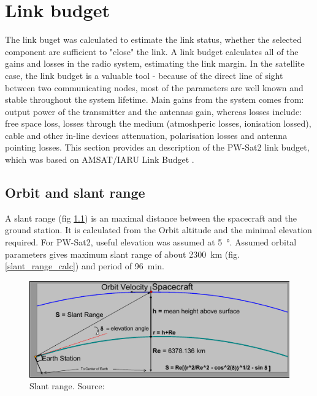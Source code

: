 \chapter{Link budget}
The link buget was calculated to estimate the link status, whether the selected component are sufficient to "close" the link. A link budget calculates all of the gains and losses in the radio system, estimating the link margin. In the satellite case, the link budget is a valuable tool - because of the direct line of sight between two communicating nodes, most of the parameters are well known and stable throughout the system lifetime. Main gains from the system comes from: output power of the transmitter and the antennas gain, whereas losses include: free space loss, losses through the medium (atmoshperic losses, ionisation lossed), cable and other in-line devices attenuation, polarisation losses and antenna pointing losses. This section provides an description of the PW-Sat2 link budget, which was based on AMSAT/IARU Link Budget \cite{amsat_link_budget}.

\section{Orbit and slant range}
A slant range (fig \ref{slant_range}) is an maximal distance between the spacecraft and the ground station. It is calculated from the Orbit altitude and the minimal elevation required. For PW-Sat2, useful elevation was assumed at \SI{5}{\degree}. Assumed orbital parameters gives maximum slant range of about \SI{2300}{\kilo\meter} (fig. \ref{slant_range_calc}) and period of \SI{96}{\minute}.

\begin{figure}
    \centering
    \includegraphics[width=0.8\paperwidth]{img/6/slant_range.pdf}
    \caption{Slant range. Source: \cite{amsat_link_budget}}
    \label{slant_range}
\end{figure}

